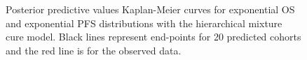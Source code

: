 \documentclass[AMA,STIX1COL]{WileyNJD-v2}
\begin{document}
\begin{figure}[H]
    \centering
    \qquad
    \caption{Posterior predictive values Kaplan-Meier curves for exponential OS and exponential PFS distributions with the hierarchical mixture cure model. Black lines represent end-points for 20 predicted cohorts and the red line is for the observed data.}%


\end{figure}
\end{document}
